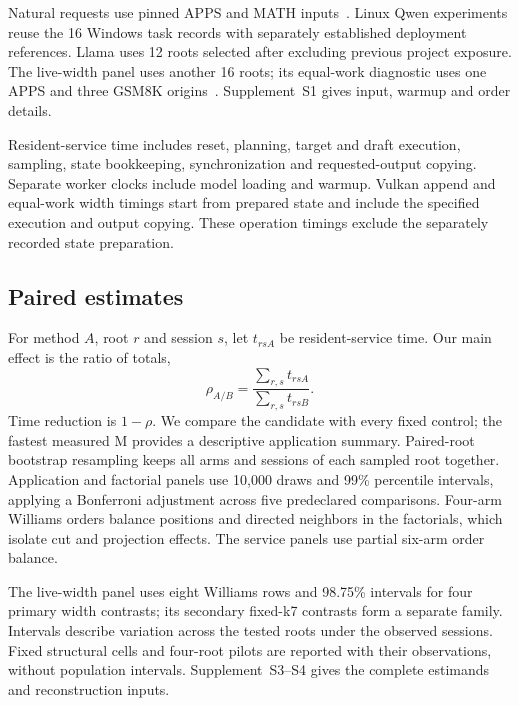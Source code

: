 Natural requests use pinned APPS and MATH inputs~\cite{apps,math}. Linux Qwen experiments reuse the 16 Windows task records with separately established deployment references. Llama uses 12 roots selected after excluding previous project exposure. The live-width panel uses another 16 roots; its equal-work diagnostic uses one APPS and three GSM8K origins~\cite{gsm8k}. Supplement~S1 gives input, warmup and order details.

Resident-service time includes reset, planning, target and draft execution, sampling, state bookkeeping, synchronization and requested-output copying. Separate worker clocks include model loading and warmup. Vulkan append and equal-work width timings start from prepared state and include the specified execution and output copying. These operation timings exclude the separately recorded state preparation.

\subsection{Paired estimates}
For method $A$, root $r$ and session $s$, let $t_{rsA}$ be resident-service time. Our main effect is the ratio of totals,
\begin{equation}
 \rho_{A/B}=\frac{\sum_{r,s}t_{rsA}}{\sum_{r,s}t_{rsB}}.
 \label{eq:ratio}
\end{equation}
Time reduction is $1-\rho$. We compare the candidate with every fixed control; the fastest measured M provides a descriptive application summary. Paired-root bootstrap resampling keeps all arms and sessions of each sampled root together. Application and factorial panels use 10,000 draws and 99\% percentile intervals, applying a Bonferroni adjustment across five predeclared comparisons. Four-arm Williams orders balance positions and directed neighbors in the factorials, which isolate cut and projection effects. The service panels use partial six-arm order balance.

The live-width panel uses eight Williams rows and 98.75\% intervals for four primary width contrasts; its secondary fixed-k7 contrasts form a separate family. Intervals describe variation across the tested roots under the observed sessions. Fixed structural cells and four-root pilots are reported with their observations, without population intervals. Supplement~S3--S4 gives the complete estimands and reconstruction inputs.
